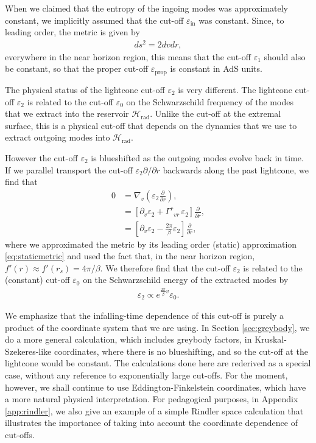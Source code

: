 \documentclass[12pt]{article}
\begin{document}
When we claimed that the entropy of the ingoing modes was approximately constant, we implicitly assumed that the cut-off $\varepsilon_\text{in}$ was constant. Since, to leading order, the metric is given by
\begin{align}
ds^2 = 2 dv dr,
\end{align}
everywhere in the near horizon region, this means that the cut-off $\varepsilon_1$ should also be constant, so that the proper cut-off $\varepsilon_\text{prop}$ is constant in AdS units. 

The physical status of the lightcone cut-off $\varepsilon_2$ is very different. The lightcone cut-off $\varepsilon_2$ is related to the cut-off $\varepsilon_0$ on the Schwarzschild frequency of the modes that we extract into the reservoir $\mathcal{H}_\text{rad}$. Unlike the cut-off at the extremal surface, this is a physical cut-off that depends on the dynamics that we use to extract outgoing modes into $\mathcal{H}_\text{rad}$. 

However the cut-off $\varepsilon_2$ is blueshifted as the outgoing modes evolve back in time. If we parallel transport the cut-off $\varepsilon_2 \partial/ \partial r$ backwards along the past lightcone, we find that
\begin{align}
0 &= \nabla_v \left(\varepsilon_2 \frac{\partial}{\partial r}\right),
\\&= \left[\partial_v \varepsilon_2 + \Gamma^r{}_{vr} \,\varepsilon_2 \right] \frac{\partial}{\partial r},
\\& = \left[\partial_v \varepsilon_2 - \frac{2 \pi}{\beta} \varepsilon_2 \right] \frac{\partial}{\partial r},
\end{align}
where we approximated the metric by its leading order (static) approximation \eqref{eq:staticmetric} and used the fact that, in the near horizon region, $f'(r) \approx f'(r_s) = 4 \pi/ \beta$. We therefore find that the cut-off $\varepsilon_2$ is related to the (constant) cut-off $\varepsilon_0$ on the Schwarzschild energy of the extracted modes by
\begin{align} \label{eq:cutoffscaling}
\varepsilon_2 \propto e^{\frac{2\pi}{\beta}v} \varepsilon_0.
\end{align}

We emphasize that the infalling-time dependence of this cut-off is purely a product of the coordinate system that we are using. In Section \ref{sec:greybody}, we do a more general calculation, which includes greybody factors, in Kruskal-Szekeres-like coordinates, where there is no blueshifting, and so the cut-off at the lightcone would be constant. The calculations done here are rederived as a special case, without any reference to exponentially large cut-offs. For the moment, however, we shall continue to use Eddington-Finkelstein coordinates, which have a more natural physical interpretation. For pedagogical purposes, in Appendix \ref{app:rindler}, we also give an example of a simple Rindler space calculation that illustrates the importance of taking into account the coordinate dependence of cut-offs.
\end{document}

